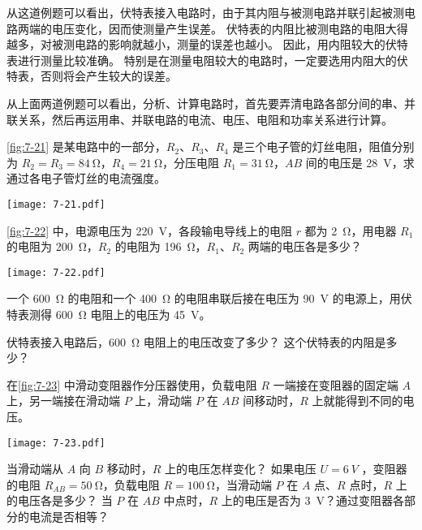 从这道例题可以看出，伏特表接入电路时，由于其内阻与被测电路并联引起被测电路两端的电压变化，因而使测量产生误差。
伏特表的内阻比被测电路的电阻大得越多，对被测电路的影响就越小，测量的误差也越小。
因此，用内阻较大的伏特表进行测量比较准确。
特别是在测量电阻较大的电路时，一定要选用内阻大的伏特表，否则将会产生较大的误差。

从上面两道例题可以看出，分析、计算电路时，首先要弄清电路各部分间的串、并联关系，然后再运用串、并联电路的电流、电压、电阻和功率关系进行计算。

\begin{Practice}
\begin{question}
  \item \cref{fig:7-21} 是某电路中的一部分，$R_2$、$R_3$、$R_4$ 是三个电子管的灯丝电阻，阻值分别为 $R_2=R_3=\qty{84}{\ohm}$，$R_4=\qty{21}{\ohm}$，分压电阻 $R_1=\qty{31}{\ohm}$，$AB$ 间的电压是 \qty{28}{V}，求通过各电子管灯丝的电流强度。
  \begin{figurehere}
    \begin{minipage}{\linewidth}\centering
      \texttt{[image: 7-21.pdf]}
      \caption{}\label{fig:7-21}
    \end{minipage}
  \end{figurehere}	
  \item \cref{fig:7-22} 中，电源电压为 \qty{220}{V}，各段输电导线上的电阻 $r$ 都为 \qty{2}{\ohm}，用电器 $R_1$ 的电阻为 \qty{200}{\ohm}，$R_2$ 的电阻为 \qty{196}{\ohm}，$R_1$、$R_2$ 两端的电压各是多少？
  \begin{figurehere}
    \begin{minipage}{\linewidth}\centering
      \texttt{[image: 7-22.pdf]}
      \caption{}\label{fig:7-22}
    \end{minipage}
  \end{figurehere}
  \item 一个 \qty{600}{\ohm} 的电阻和一个 \qty{400}{\ohm} 的电阻串联后接在电压为 \qty{90}{V} 的电源上，用伏特表测得 \qty{600}{\ohm} 电阻上的电压为 \qty{45}{V}。
  \begin{tasks}
    \task 伏特表接入电路后，\qty{600}{\ohm} 电阻上的电压改变了多少？
    \task 这个伏特表的内阻是多少？
  \end{tasks}
  \item 在\cref{fig:7-23} 中滑动变阻器作分压器使用，负载电阻 $R$ 一端接在变阻器的固定端 $A$ 上，另一端接在滑动端 $P$ 上，滑动端 $P$ 在 $AB$ 间移动时，$R$ 上就能得到不同的电压。
  \begin{figurehere}
    \begin{minipage}{\linewidth}\centering
      \texttt{[image: 7-23.pdf]}
      \caption{}\label{fig:7-23}
    \end{minipage}
  \end{figurehere}
  \begin{tasks}
    \task 当滑动端从 $A$ 向 $B$ 移动时，$R$ 上的电压怎样变化？
    \task 如果电压 $U=\qty{6}{V}$ ，变阻器的电阻 $R_{AB}= \qty{50}{\ohm}$，负载电阻 $R=\qty{100}{\ohm}$，当滑动端 $P$ 在 $A$ 点、$R$ 点时，$R$ 上的电压各是多少？
    \task 当 $P$ 在 $AB$ 中点时，$R$ 上的电压是否为 \qty{3}{V}？通过变阻器各部分的电流是否相等？
  \end{tasks}
\end{question}
\end{Practice}

